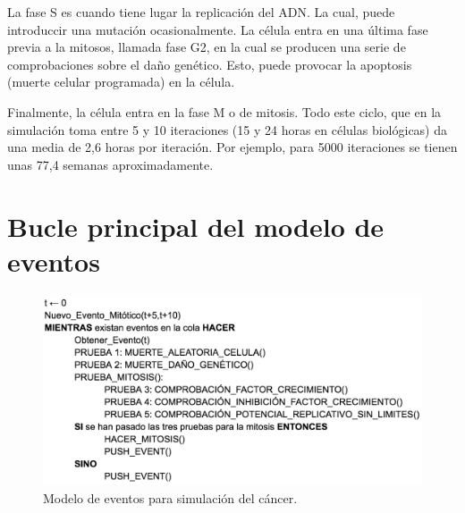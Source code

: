 La fase S es cuando tiene lugar la replicación del ADN. La cual, puede introduccir una mutación ocasionalmente.
La célula entra en una última fase previa a la mitosos, llamada fase G2, en la cual se producen una serie
de comprobaciones sobre el daño genético. Esto, puede provocar la apoptosis (muerte celular programada) en la célula.

Finalmente, la célula entra en la fase M o de mitosis. Todo este ciclo, que en la simulación toma entre 5 y 10 iteraciones
(15 y 24 horas en células biológicas) da una media de 2,6 horas por iteración. Por ejemplo, para 5000 iteraciones se tienen
unas 77,4 semanas aproximadamente.

\section{Bucle principal del modelo de eventos}

\begin{figure}[h]
\centering
\includegraphics[scale=0.4]{figures/pseudo_alg}
\caption{Modelo de eventos para simulación del cáncer.}
\end{figure}
